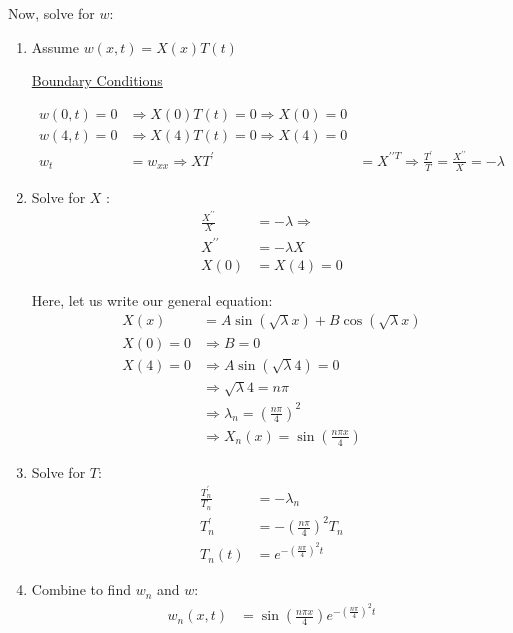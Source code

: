 \documentclass{article}
\begin{document}
Now, solve for $w$:
\begin{enumerate}
  \item Assume $w(x, t) = X(x)T(t)$

  \underline{Boundary Conditions}

  \begin{align}
    w(0, t) = 0 & \Rightarrow X(0)T(t) = 0 \Rightarrow X(0) = 0\\
    w(4, t) = 0 & \Rightarrow X(4)T(t) = 0 \Rightarrow X(4) = 0\\
    w_t & = w_{xx} \Rightarrow XT^\prime & = X^{\prime\prime T} \Rightarrow \frac{T^\prime}{T} = \frac{X^{\prime\prime}}{X} = - \lambda
  \end{align}

  \item Solve for $X$ :
  \begin{align}
    \frac{X^{\prime\prime}}{X} & = - \lambda \Rightarrow\\
    X^{\prime\prime} & = -\lambda X\\
    X(0) & = X(4) = 0
  \end{align}

  Here, let us write our general equation:
  \begin{align}
    X(x) & = A \sin(\sqrt \lambda x) + B \cos(\sqrt \lambda x)\\
    X(0) = 0 & \Rightarrow B = 0\\
    X(4) = 0 & \Rightarrow A \sin(\sqrt \lambda 4) = 0\\
    & \Rightarrow \sqrt \lambda 4 = n \pi\\
    & \Rightarrow \lambda_n = \left(\frac{n \pi}{4} \right)^2\\
    & \Rightarrow X_n(x) = \sin\left( \frac{n \pi x}{4} \right)
  \end{align}

  \item Solve for $T$:
  \begin{align}
    \frac{T^\prime_n}{T_n} & = -\lambda_n\\
    T^\prime_n & = -\left( \frac{n \pi}{4} \right)^2 T_n\\
    T_n(t) & = e^{- \left( \frac{n \pi}{4} \right)^2 t}
  \end{align}

  \item Combine to find $w_n$ and $w$:
  \begin{align}
    w_n(x, t) & = \sin\left(\frac{n \pi x}{4} \right)e^{-\left(\frac{n \pi}{4} \right)^2 t}
  \end{align}


\end{enumerate}
\end{document}
